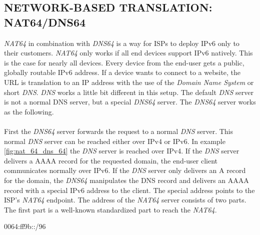 \documentclass[format=sigconf, natbib=true, nonacm=true]{acmart}
\begin{document}
    \subsection{NETWORK-BASED TRANSLATION: NAT64/DNS64}
    \textit{NAT64} in combination with \textit{DNS64} is a way for ISPs to deploy IPv6 only to their customers. \textit{NAT64} only works if all end devices support IPv6 natively. This is the case for nearly all devices. Every device from the end-user gets a public, globally routable IPv6 address. If a device wants to connect to a website, the URL is translation to an IP address with the use of the \textit{Domain Name System} or short \textit{DNS}. \textit{DNS} works a little bit different in this setup. The default \textit{DNS} server is not a normal DNS server, but a special \textit{DNS64} server. The \textit{DNS64} server works as the following.\\\\First the \textit{DNS64} server forwards the request to a normal \textit{DNS} server. This normal \textit{DNS} server can be reached either over IPv4 or IPv6. In example \ref{fig:nat_64_dns_64} the \textit{DNS} server is reached over IPv4. If the \textit{DNS} server delivers a AAAA record for the requested domain, the end-user client communicates normally over IPv6. If the \textit{DNS} server only delivers an A record for the domain, the \textit{DNS64} manipulates the DNS record and delivers an AAAA record with a special IPv6 address to the client. The special address points to the ISP's \textit{NAT64} endpoint. The address of the \textit{NAT64} server consists of two parts. The first part is a well-known standardized part to reach the \textit{NAT64}.
    \begin{center}
        0064:ff9b::/96
    \end{center}
\end{document}
